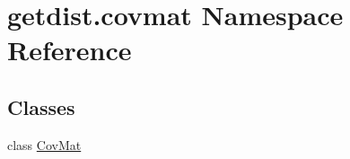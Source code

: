 \hypertarget{namespacegetdist_1_1covmat}{}\section{getdist.\+covmat Namespace Reference}
\label{namespacegetdist_1_1covmat}
\subsection*{Classes}
\begin{DoxyCompactItemize}
\item 
class \mbox{\hyperlink{classgetdist_1_1covmat_1_1CovMat}{Cov\+Mat}}
\end{DoxyCompactItemize}
